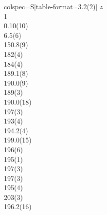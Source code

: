 \begin{tblr}{colspec={S[table-format=3.2(2)]}}
{{{$z$}}}\\
{{{\si{1}}}}\\
0.10(10)\\
6.5(6)\\
150.8(9)\\
182(4)\\
184(4)\\
189.1(8)\\
190.0(9)\\
189(3)\\
190.0(18)\\
197(3)\\
193(4)\\
194.2(4)\\
199.0(15)\\
196(6)\\
195(1)\\
197(3)\\
197(3)\\
195(4)\\
203(3)\\
196.2(16)\\
\end{tblr}
